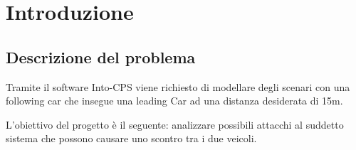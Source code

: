 \section{Introduzione}
\subsection{Descrizione del problema}
Tramite il software Into-CPS viene richiesto di modellare degli scenari con una following car che insegue una leading Car ad una distanza desiderata di 15m.

L'obiettivo del progetto è il seguente: analizzare possibili attacchi al suddetto sistema che possono causare uno scontro tra i due veicoli.

